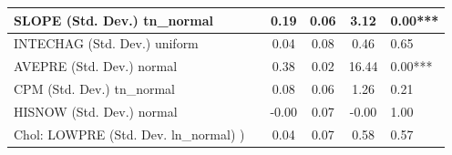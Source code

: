 \begin{table}
\begin{center}
\begin{tabular}{|l|l|c|c|c|l|}
			\hline
			SLOPE (Std. Dev.) tn_normal &  & 0.19 & 0.06 & 3.12 & 0.00*** \\
			\hline
			INTECHAG (Std. Dev.) uniform &  & 0.04 & 0.08 & 0.46 & 0.65 \\
			\hline
			AVEPRE (Std. Dev.) normal &  & 0.38 & 0.02 & 16.44 & 0.00*** \\
			\hline
			CPM (Std. Dev.) tn_normal &  & 0.08 & 0.06 & 1.26 & 0.21 \\
			\hline
			HISNOW (Std. Dev.) normal &  & -0.00 & 0.07 & -0.00 & 1.00 \\
			\hline
			 Chol: LOWPRE (Std. Dev. ln_normal) ) &  & 0.04 & 0.07 & 0.58 & 0.57 \\
			\hline
		\end{tabular}
	\end{center}
\end{table}